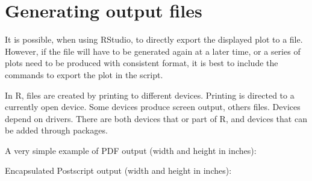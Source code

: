 \documentclass[paper=a4,headsepline,BCOR=12mm,twoside,open=right,%
titlepage,headings=small,fontsize=10pt,index=totoc,bibliography=totoc,%
captions=tableheading,captions=nooneline]{scrbook}\usepackage{knitr}
\begin{document}
\section{Generating output files}

It is possible, when using RStudio, to directly export the displayed plot to a file. However, if the file will have to be generated again at a later time, or a series of plots need to be produced with consistent format, it is best to include the commands to export the plot in the script.

In R, files are created by printing to different devices. Printing is directed to a currently open device. Some devices produce screen output, others files. Devices depend on drivers. There are both devices that or part of R, and devices that can be added through packages.

A very simple example of PDF output (width and height in inches):

\begin{knitrout}\footnotesize
{}\color{fgcolor}\begin{kframe}
\begin{alltt}
 \hlkwb{<-} \hlstd{(}\hlstd{(}\hlstd{=}\hlopt{-}\hlopt{:}\hlstd{),} \hlstd{(} \hlopt{+}
  \hlstd{(}
\hlstd{(}\hlstd{=}\hlstd{,} \hlstd{=}\hlstd{,} \hlstd{=}\hlstd{)}
\hlstd{()}
\end{alltt}
\end{kframe}
\end{knitrout}

Encapsulated Postscript output (width and height in inches):

\begin{knitrout}\footnotesize
{}\color{fgcolor}\begin{kframe}
\begin{alltt}
\hlstd{(}\hlstd{=}\hlstd{,} \hlstd{=}\hlstd{,} \hlstd{=}\hlstd{)}
\hlstd{()}
\end{alltt}
\end{kframe}
\end{knitrout}
\end{document}
